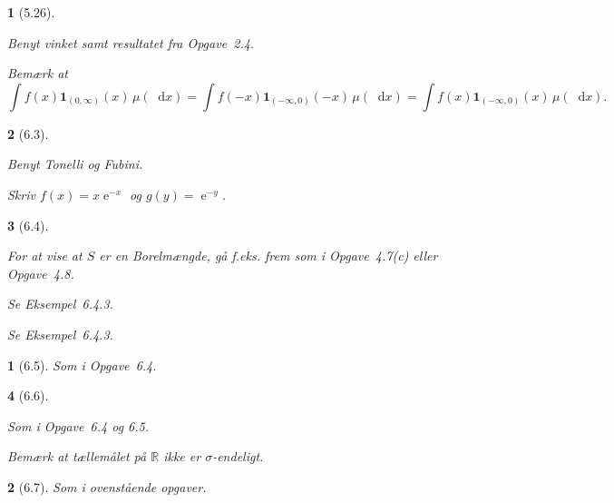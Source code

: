 \documentclass[a4paper, 11pt, article, danish, oneside]{memoir}
\newcommand{\reals}{\mathbb{R}}
\newcommand{\dif}{\mathop{}\!\mathrm{d}}
\newcommand{\indicator}[1]{\mathbf{1}_{#1}}
\DeclareMathOperator{\e}{\mathrm{e}}
\newcommand{\pencilsymbol}{\raisebox{-2pt}{\normalfont\PencilLeft}}
\theoremstyle{changedotcustomnumber}
\newtheorem{opgave}{\pencilsymbol}
\theoremstyle{changedotbreakcustomnumber}
\newtheorem{opgavebreak}{\pencilsymbol}
\begin{document}
\begin{opgavebreak}[5.26]
\begin{solutionsec}
    \item Benyt vinket samt resultatet fra Opgave~2.4.

    \item Bemærk at
    \begin{equation*}
        \int f(x) \indicator{(0,\infty)}(x) \,\mu(\dif x)
            = \int f(-x) \indicator{(-\infty,0)}(-x) \,\mu(\dif x)
            = \int f(x) \indicator{(-\infty,0)}(x) \,\mu(\dif x).
    \end{equation*}
\end{solutionsec}
\end{opgavebreak}


\begin{opgavebreak}[6.3]
\begin{solutionsec}
    \item Benyt Tonelli og Fubini.

    \item Skriv $f(x) = x \e^{-x}$ og $g(y) = \e^{-y}$.
\end{solutionsec}
\end{opgavebreak}


\begin{opgavebreak}[6.4]
\begin{solutionsec}
    \item For at vise at $S$ er en Borelmængde, gå f.eks. frem som i Opgave~4.7(c) eller Opgave~4.8.

    \item Se Eksempel~6.4.3.

    \item Se Eksempel~6.4.3.
\end{solutionsec}
\end{opgavebreak}


\begin{opgave}[6.5]
    Som i Opgave~6.4.
\end{opgave}


\begin{opgavebreak}[6.6]
\begin{solutionsec}
    \item Som i Opgave~6.4 og 6.5.

    \item Bemærk at tællemålet på $\reals$ ikke er $\sigma$-endeligt.
\end{solutionsec}
\end{opgavebreak}


\begin{opgave}[6.7]
    Som i ovenstående opgaver.
\end{opgave}
\end{document}
